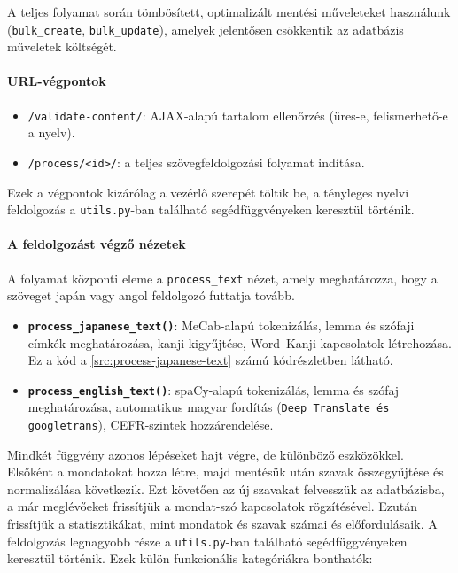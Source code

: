 A teljes folyamat során tömbösített, optimalizált mentési műveleteket használunk (\texttt{bulk\_create}, \texttt{bulk\_update}), amelyek jelentősen csökkentik az adatbázis műveletek költségét.

\paragraph{URL-végpontok}

\begin{itemize}
    \item \texttt{/validate-content/}: AJAX-alapú tartalom ellenőrzés (üres-e, felismerhető-e a nyelv).
    \item \texttt{/process/<id>/}: a teljes szövegfeldolgozási folyamat indítása.
\end{itemize}

Ezek a végpontok kizárólag a vezérlő szerepét töltik be, a tényleges
nyelvi feldolgozás a \texttt{utils.py}-ban található segédfüggvényeken keresztül történik.

\paragraph{A feldolgozást végző nézetek}

A folyamat központi eleme a \texttt{process\_text} nézet, amely meghatározza, hogy a szöveget japán vagy angol feldolgozó futtatja tovább. 

\begin{itemize}
    \item \textbf{\texttt{process\_japanese\_text()}}: MeCab-alapú
    tokenizálás, lemma és szófaji címkék meghatározása, kanji kigyűjtése,
    Word–Kanji kapcsolatok létrehozása. Ez a kód a \ref{src:process-japanese-text} számú kódrészletben látható.
    \item \textbf{\texttt{process\_english\_text()}}: spaCy-alapú
    tokenizálás, lemma és szófaj meghatározása, automatikus magyar fordítás
    (\texttt{Deep Translate és googletrans}), CEFR-szintek hozzárendelése.
\end{itemize}

Mindkét függvény azonos lépéseket hajt végre, de különböző eszközökkel. Elsőként a mondatokat hozza létre, majd mentésük után szavak összegyűjtése és normalizálása következik. Ezt követően az új szavakat felvesszük az adatbázisba, a már meglévőeket frissítjük a mondat-szó kapcsolatok rögzítésével. Ezután frissítjük a statisztikákat, mint mondatok és szavak számai és előfordulásaik. A feldolgozás legnagyobb része a \texttt{utils.py}-ban található segédfüggvényeken keresztül történik. Ezek külön funkcionális kategóriákra bonthatók:

